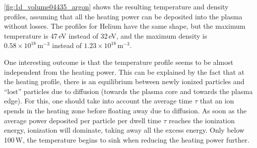 
\autoref{fig:1d_volume04435_argon} shows the resulting temperature and density profiles, assuming that all the heating power can be deposited into the plasma without losses. The profiles for Helium have the same shape, but the maximum temperature is 47\,eV instead of 32\,eV, and the maximum density is $0.58 \times 10^{18} \, \si{\meter^{-3}}$ instead of $1.23 \times 10^{18} \, \si{\meter^{-3}}$.


\begin{figure}[H]
  \label{fig:1d_volume04435_argon}
\end{figure}

\par One interesting outcome is that the temperature profile seems to be almost independent from the heating power.
This can be explained by the fact that at the heating profile, there is an equilibrium between newly ionized particles and ``lost'' particles due to diffusion (towards the plasma core and towards the plasma edge).
For this, one should take into account the average time $\tau$ that an ion spends in the heating zone before floating away due to diffusion.
As soon as the average power deposited per particle per dwell time $\tau$ reaches the ionization energy, ionization will dominate, taking away all the excess energy.
Only below 100\,W, the temperature begins to sink when reducing the heating power further.

